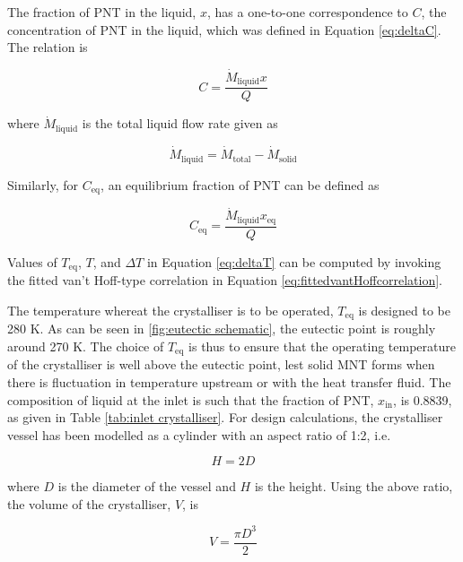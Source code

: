The fraction of PNT in the liquid, $x$, has a one-to-one correspondence to $C$, the concentration of PNT in the liquid, which was defined in Equation \ref{eq:deltaC}. The relation is 

\begin{equation}
    C = \frac{\dot{M}_{\mathrm{liquid}} x}{Q}
\end{equation}

\noindent where $\dot{M}_{\mathrm{liquid}}$ is the total liquid flow rate given as 

\begin{equation}
    \dot{M}_{\mathrm{liquid}} = \dot{M}_{\mathrm{total}} - \dot{M}_{\mathrm{solid}}
\end{equation}

\noindent Similarly, for $C_{\mathrm{eq}}$, an equilibrium fraction of PNT can be defined as

\begin{equation}
    C_{\mathrm{eq}} = \frac{\dot{M}_{\mathrm{liquid}} x_{\mathrm{eq}}}{Q}
\end{equation}

\noindent Values of $T_{\mathrm{eq}}$, $T$, and $\Delta T$ in Equation \ref{eq:deltaT} can be computed by invoking the fitted van't Hoff-type correlation in Equation \ref{eq:fittedvantHoffcorrelation}. 

The temperature whereat the crystalliser is to be operated, $T_{\mathrm{eq}}$ is designed to be 280 K. As can be seen in \cref{fig:eutectic schematic}, the eutectic point is roughly around 270 K. The choice of $T_{\mathrm{eq}}$ is thus to ensure that the operating temperature of the crystalliser is well above the eutectic point, lest solid MNT forms when there is fluctuation in temperature upstream or with the heat transfer fluid. The composition of liquid at the inlet is such that the fraction of PNT, $x_{\mathrm{in}}$, is 0.8839, as given in Table \ref{tab:inlet crystalliser}. For design calculations, the crystalliser vessel has been modelled as a cylinder with an aspect ratio of 1:2, i.e. 

\begin{equation}
    H = 2D
\end{equation}

\noindent where $D$ is the diameter of the vessel and $H$ is the height. Using the above ratio, the volume of the crystalliser, $V$, is

\begin{equation} \label{eq:crystalliser volume}
    V = \frac{\pi D^3}{2} 
\end{equation}


